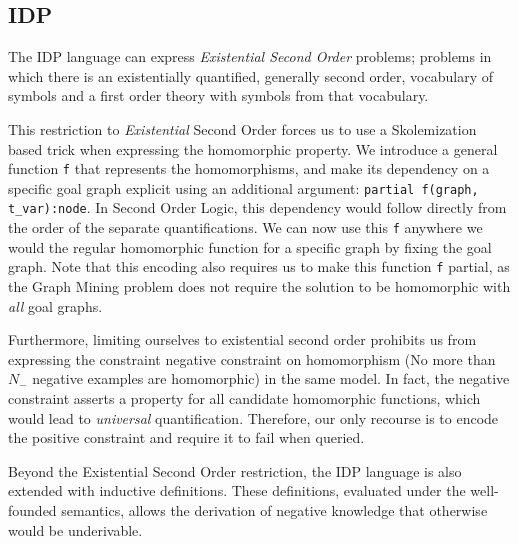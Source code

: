 \documentclass{article}
\theoremstyle{definition}
\begin{document}

\subsection{IDP}
The IDP language can express \emph{Existential Second Order} problems; problems in which there is an existentially quantified, generally second order, vocabulary of symbols and a first order theory with symbols from that vocabulary.

This restriction to \emph{Existential} Second Order forces us 
to use a Skolemization based trick when expressing the homomorphic property.
We introduce a general function \verb|f| that represents the homomorphisms, and make its dependency on a specific goal graph explicit using an additional argument:
\verb|partial f(graph, t_var):node|.
In Second Order Logic, this dependency would follow directly from the order of the separate quantifications.
We can now use this \verb|f| anywhere we would the regular homomorphic function for a specific graph by fixing the goal graph.
Note that this encoding also requires us to make this function \verb|f| partial, as the Graph Mining problem does not require the solution to be homomorphic with \emph{all} goal graphs.

Furthermore, limiting ourselves to existential second order prohibits us from expressing the constraint negative constraint on homomorphism (No more than $N_{-}$ negative examples are homomorphic) in the same model.
In fact, the negative constraint asserts a property for all candidate homomorphic functions, which would lead to \emph{universal} quantification.
Therefore, our only recourse is to encode the positive constraint and require it to fail when queried.

Beyond the Existential Second Order restriction, the IDP language is also extended with inductive definitions. These definitions, evaluated under the well-founded semantics, allows the derivation of negative knowledge that otherwise would be underivable.
\reversemarginpar
{}
\end{document}
